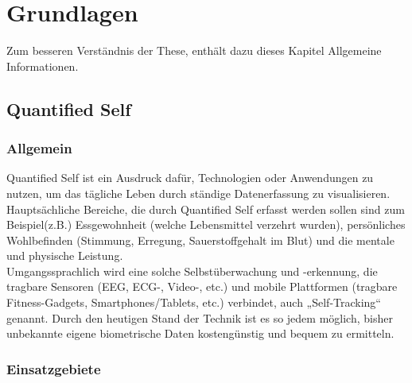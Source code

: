 
\chapter{Grundlagen}
\label{ch:Grundlagen}
Zum besseren Verständnis der These, enthält dazu dieses Kapitel Allgemeine Informationen.


\section{Quantified Self}
\label{ch:Grundlagen:sec:QuantifiedSelf}

\subsection{Allgemein}
\label{ch:Grundlagen:sec:QuantifiedSelf:subsec:Allgemein}

Quantified Self ist ein Ausdruck dafür, Technologien oder Anwendungen zu nutzen, um das tägliche Leben durch ständige Datenerfassung zu visualisieren. 
Hauptsächliche Bereiche, die durch Quantified Self erfasst werden sollen sind zum Beispiel(z.B.) Essgewohnheit (welche Lebensmittel verzehrt wurden), persönliches Wohlbefinden (Stimmung, Erregung, Sauerstoffgehalt im Blut) und die mentale und physische Leistung\cite{web:WhatIsQS}. \\
Umgangssprachlich wird eine solche Selbstüberwachung und -erkennung, die tragbare Sensoren (EEG, ECG-, Video-, etc.) und mobile Plattformen (tragbare Fitness-Gadgets, Smartphones/Tablets, etc.) verbindet, auch „Self-Tracking“ genannt. 
Durch den heutigen Stand der Technik ist es so jedem möglich, bisher unbekannte eigene biometrische Daten kostengünstig und bequem zu ermitteln.

\subsection{Einsatzgebiete}
\label{ch:Grundlagen:sec:QuantifiedSelf:subsec:Einsatzgebiete}

